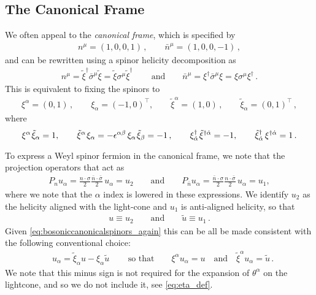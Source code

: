 \documentclass[12pt,document,nofootinbib,superscriptaddress,onecolumn,preprintnumbers,balancelastpage]{article}
\newcommand{\s}{\hspace{0.8pt}}
\begin{document}
\subsection{The Canonical Frame}
We often appeal to the \emph{canonical frame}, which is specified by 
%
\begin{align}
n^\mu = (1,0,0,1)\,, \qquad \bar{n}^\mu = (1,0,0,-1)\,,
\end{align}
%
and can be rewritten using a spinor helicity decomposition as
%
\begin{align}
n^\mu = \tilde{\xi}^\dag \bar{\sigma}^\mu \tilde{\xi} = \tilde{\xi} \sigma^\mu \tilde{\xi}^\dag \, \qquad \text{and} \qquad \bar{n}^\mu = \xi^\dag \bar{\sigma}^\mu \xi = \xi \sigma^\mu \xi^\dag\,.
\end{align}
%
This is equivalent to fixing the spinors to
\begin{align}
\label{eq:bosoniccanonicalspinors_again}
\xi^\alpha = (0,1)\,,\qquad \xi_\alpha = (-1,0)^{\intercal}, \qquad \tilde{\xi}^\alpha = (1,0)\,, \qquad \tilde{\xi}_\alpha = (0,1)^{\intercal}\,,
\end{align}
%
where
%
\begin{equation}
\xi^\alpha\s \tilde{\xi}_\alpha = 1, \qquad \tilde{\xi}^\alpha\s \xi_\alpha = - \epsilon^{\alpha \beta}\, \xi_\alpha \s\tilde{\xi}_\beta =-1\,, \qquad\xi^\dagger_{\dot{\alpha}}\s \tilde{\xi}^{\dagger \dot{\alpha}} = -1, \qquad \tilde{\xi}^\dag_{\dot{\alpha}}\, \xi^{\dag \dot{\alpha}} = 1\,.
\end{equation}

To express a Weyl spinor fermion in the canonical frame, we note that the projection operators that act as
%
\begin{align}
P_n u_\alpha = \frac{n\cdot\sigma}{2} \frac{\bar{n}\cdot \bar{\sigma}}{2}\, u_\alpha = u_2 \qquad \text{and} \qquad P_{\bar{n}} u_\alpha =\frac{\bar{n}\cdot\sigma}{2} \frac{n\cdot \bar{\sigma}}{2}\, u_\alpha =  u_1,
\end{align}
%
where we note that the $\alpha$ index is lowered in these expressions. 
%
We identify $u_2$ as the helicity aligned with the light-cone and $u_1$ is anti-aligned helicity, so that
\begin{align}
u \equiv u_2  \qquad \text{and} \qquad \tilde{u} \equiv u_1\,.
\end{align}
Given \eqref{eq:bosoniccanonicalspinors_again} this can be all be made consistent with the following conventional choice: 
\begin{align}
&u_\alpha =  \tilde{\xi}_\alpha u - \xi_\alpha \tilde{u}\,  \qquad \text{so that} \qquad \xi^\alpha u_\alpha = u \quad \text{and} \quad \tilde{\xi}^\alpha u_\alpha = \tilde{u}\,.
\end{align}
We note that this minus sign is not required for the expansion of $\theta^\alpha$ on the lightcone, and so we do not include it, see \eqref{eq:eta_def}.
\end{document}
